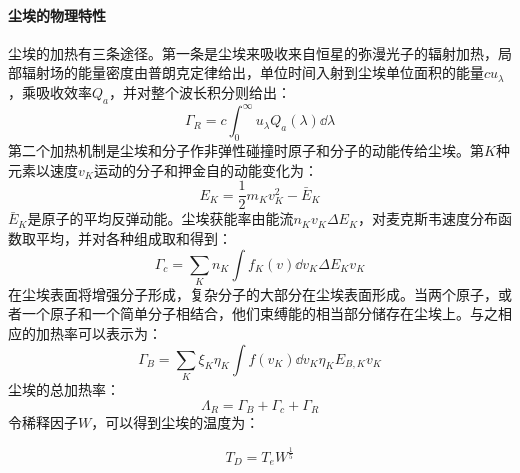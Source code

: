 \paragraph{尘埃的物理特性}
尘埃的加热有三条途径。第一条是尘埃来吸收来自恒星的弥漫光子的辐射加热，局部辐射场的能量密度由普朗克定律给出，单位时间入射到尘埃单位面积的能量$cu_{\lambda}$，乘吸收效率$Q_{a}$，并对整个波长积分则给出：
\begin{equation}
	\varGamma_{R}=c\int_{0}^{\infty}u_{\lambda}Q_{a}(\lambda)\dd \lambda
\end{equation}
第二个加热机制是尘埃和分子作非弹性碰撞时原子和分子的动能传给尘埃。第$K$种元素以速度$v_{K}$运动的分子和押金自的动能变化为：
\begin{equation}
	E_{K}=\frac{1}{2}m_{K}v_{K}^2-\bar{E}_{K}
\end{equation}
$\bar{E}_{K}$是原子的平均反弹动能。尘埃获能率由能流$n_{K}v_{K}\Delta E_{K}$，对麦克斯韦速度分布函数取平均，并对各种组成取和得到：
\begin{equation}
	\varGamma_{c}=\sum_{K}n_{K}\int f_{K}(v)\dd v_{K}\Delta E_{K}v_{K}
\end{equation}
在尘埃表面将增强分子形成，复杂分子的大部分在尘埃表面形成。当两个原子，或者一个原子和一个简单分子相结合，他们束缚能的相当部分储存在尘埃上。与之相应的加热率可以表示为：
\begin{equation}
	\varGamma_{B}=\sum_{K}\xi_{K}\eta_{K}\int f(v_{K})\dd v_{K} \eta_{K}E_{B,K}v_{K}
\end{equation}
尘埃的总加热率：
\begin{equation}
	\varLambda_{R}=\varGamma_{B}+\varGamma_{c}+\varGamma_{R}
\end{equation}
令稀释因子$W$，可以得到尘埃的温度为：

\begin{equation}
	T_{D}=T_{e}W^{\frac{1}{5}}
\end{equation}

